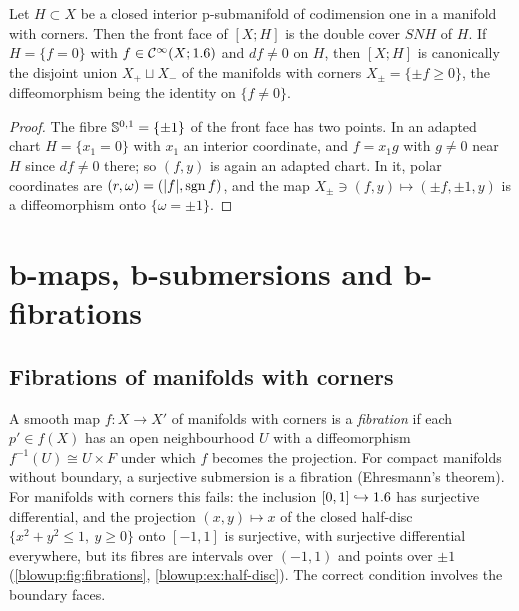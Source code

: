 \begin{proposition}\label{blowup:prop:hypersurface}
Let $H\subset X$ be a closed interior p-submanifold of codimension one in a manifold with
corners. Then the front face of $[X;H]$ is the double cover $SNH$ of $H$. If
$H=\{f=0\}$ with $f\in\mathcal{C}^\infty(X;1.6)$ and $df\ne0$ on $H$, then $[X;H]$ is canonically the
disjoint union $X_+\sqcup X_-$ of the manifolds with corners $X_\pm=\{\pm f\ge0\}$, the
diffeomorphism being the identity on $\{f\ne0\}$.
\end{proposition}
\begin{proof}
The fibre $\mathbb{S}^{0,1}=\{\pm1\}$ of the front face has two points. In an adapted chart
$H=\{x_1=0\}$ with $x_1$ an interior coordinate, and $f=x_1g$ with $g\ne0$ near $H$ since
$df\ne0$ there; so $(f,y)$ is again an adapted chart. In it, polar coordinates are
$(r,\omega)=(\lvert f\rvert,\operatorname{sgn} f)$, and the map $X_\pm\ni(f,y)\mapsto(\pm f,\pm1,y)$ is a
diffeomorphism onto $\{\omega=\pm1\}$.
\end{proof}

\section{b-maps, b-submersions and b-fibrations}\label{blowup:sec:bfib}

\subsection{Fibrations of manifolds with corners}
A smooth map $f:X\to X'$ of manifolds with corners is a \emph{fibration} if each
$p'\in f(X)$ has an open neighbourhood $U$ with a diffeomorphism $f^{-1}(U)\cong U\times F$
under which $f$ becomes the projection. For compact manifolds without boundary, a
surjective submersion is a fibration (Ehresmann's theorem). For manifolds with corners
this fails: the inclusion $[0,1]\hookrightarrow1.6$ has surjective differential, and the
projection $(x,y)\mapsto x$ of the closed half-disc
$\{x^2+y^2\le1,\ y\ge0\}$ onto $[-1,1]$ is surjective, with surjective differential
everywhere, but its fibres are intervals over $(-1,1)$ and points over $\pm1$
(\cref{blowup:fig:fibrations}, \cref{blowup:ex:half-disc}). The correct condition involves
the boundary faces.

